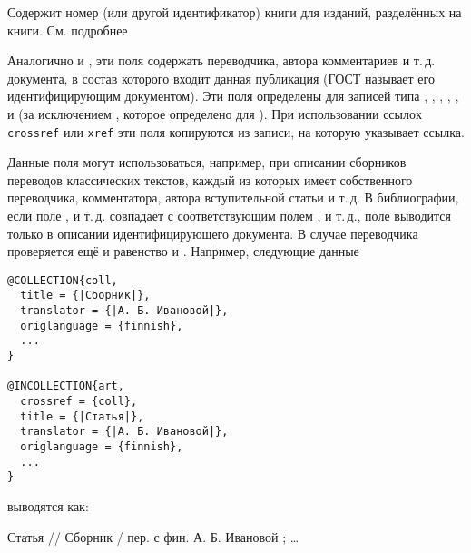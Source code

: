 \documentclass[10pt,a4paper,headings=small,numbers=enddot,english,russian]{ltxdockit}
\newcommand*{\noitemspace}{\vspace{-\itemsep}\vspace{-\parsep}\vspace{-.6ex}}
\newenvironment{bibexample}{\begin{list}
     {}
     {\setlength{\leftmargin}{\parindent}%
      \setlength{\itemindent}{-\leftmargin}%
      \setlength{\parsep}{0pt}}}
  {\end{list}}
\begin{document}
\begin{fieldlist}


Содержит номер (или другой идентификатор) книги для изданий, разделённых на книги. См. подробнее

\noitemspace%
\noitemspace%
\noitemspace%
\noitemspace%
\noitemspace%
\noitemspace%
\noitemspace%
\noitemspace%

Аналогично  и , эти поля
  содержать переводчика, автора комментариев и т.\,д. документа, в состав которого входит
  данная публикация (ГОСТ называет его идентифицирующим документом).
Эти поля определены для записей типа
  , , , ,
  , 
  и 
  (за исключением , которое определено для ).
При использовании ссылок \texttt{crossref} или \texttt{xref} эти поля копируются из записи,
  на которую указывает ссылка.

Данные поля могут использоваться, например, при описании сборников переводов классических текстов,
каждый из которых имеет собственного переводчика, комментатора, автора вступительной статьи
и т.\,д. В библиографии, если поле ,  и т.\,д.
совпадает с соответствующим полем ,  и т.\,д.,
поле выводится только в описании идентифицирующего документа. В случае переводчика проверяется
ещё и равенство  и . Например,
следующие данные

\begin{lstlisting}[style=bibtex,escapechar=|]
@COLLECTION{coll,
  title = {|Сборник|},
  translator = {|А. Б. Ивановой|},
  origlanguage = {finnish},
  ...
}

@INCOLLECTION{art,
  crossref = {coll},
  title = {|Статья|},
  translator = {|А. Б. Ивановой|},
  origlanguage = {finnish},
  ...
}
\end{lstlisting}

выводятся как:

\begin{bibexample}
\item Статья // Сборник / пер. с фин. А. Б. Ивановой ; \ldots
\end{bibexample}


\end{fieldlist}
\end{document}
